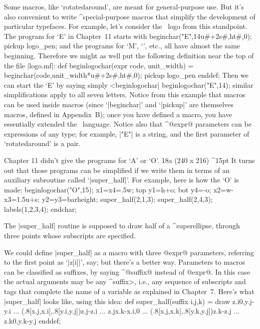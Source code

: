 {{{{Some macros, like `rotatedaround', are meant for general-purpose use.
But it's also convenient to write ^{special-purpose macros} that simplify
the development of particular typefaces. For example, let's consider the
\MF\ logo from this standpoint. The program for `{\manual E}' in
Chapter~11 starts with
\begintt
beginchar("E",14u#+2s#,ht#,0); pickup logo_pen;
\endtt
and the programs for `{\manual M}', `\kern1pt',
etc., all have almost the same beginning. Therefore we might as
well put the following definition near the top of the file |logo.mf|:
\begintt
def beginlogochar(expr code, unit_width) =
 beginchar(code,unit_width*u#+2s#,ht#,0);
 pickup logo_pen enddef;
\endtt
Then we can start the `{\manual E}' by saying simply ^^|beginlogochar|
\begintt
beginlogochar("E",14);
\endtt
similar simplifications apply to all seven letters. Notice from
this example that macros can be used inside macros (since `|beginchar|'
and `|pickup|' are themselves macros, defined in Appendix~B\null); once you
have defined a macro, you have essentially extended the \MF\ language.
Notice also that ^@expr@ parameters can be expressions of any type;
for example, |"E"| is a string, and the first parameter of
`rotatedaround' is a pair.

\decreasehsize 48mm
Chapter 11 didn't give the programs for `{\manual A}' or `{\manual O}'.
\rightfig 18a ({240\apspix} x {216\apspix}) ^15pt
It turns out that those programs can be simplified if we write
them in terms of an auxiliary subroutine called `|super_half|'.
For example, here is how the `{\manual O}' is made:
\begintt
beginlogochar("O",15);
x1=x4=.5w; top y1=h+o; bot y4=-o;
x2=w-x3=1.5u+s; y2=y3=barheight;
super_half(2,1,3);
super_half(2,4,3);
labels(1,2,3,4); endchar;
\endtt

\restorehsize\medbreak\noindent
The |super_half| routine is supposed to draw half of a ^{superellipse},
through three points whose subscripts are specified.

\restorehsize
We could define |super_half| as a macro with three @expr@ parameters,
referring to the first point as `|z[i]|', say; but there's a better way.
Parameters to macros can be classified as suffixes, by saying ^@suffix@
instead of @expr@. In this case
the actual arguments may be any ^\<suffix>, i.e., any sequence of
subscripts and tags that complete the name of a variable as explained
in Chapter~7. Here's what |super_half| looks like, using this idea:
\begintt
def super_half(suffix i,j,k) =
 draw z.i{0,y.j-y.i}
  ... (.8[x.j,x.i],.8[y.i,y.j]){z.j-z.i}
  ... z.j{x.k-x.i,0}
  ... (.8[x.j,x.k],.8[y.k,y.j]){z.k-z.j}
  ... z.k{0,y.k-y.j} enddef;
\endtt

}}}}
